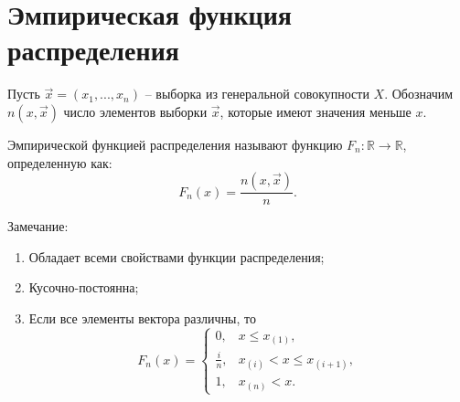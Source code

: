 \chapter{Эмпирическая функция распределения}

Пусть $\vec x = (x_1, ..., x_n)$ -- выборка из генеральной совокупности	$X$. Обозначим $n(x, \vec x)$ число элементов выборки $\vec x$, которые имеют значения меньше $x$.

Эмпирической функцией распределения называют функцию $F_n : \mathbb{R} \rightarrow \mathbb{R}$, определенную как:
\begin{equation}
F_n (x) = \frac{n(x, \vec x)}{n}.
\end{equation}

Замечание:
\begin{enumerate}
	\item Обладает всеми свойствами функции распределения;
	\item Кусочно-постоянна;
	\item Если все элементы вектора различны, то
	\begin{equation}
		F_n(x) = \begin{cases}
			0, & x \leq x_{(1)},\\
			\displaystyle \frac{i}{n}, & x_{(i)} < x \leq x_{(i + 1)},\\
			1, & x_{(n)} < x.
		\end{cases}
	\end{equation}
\end{enumerate}